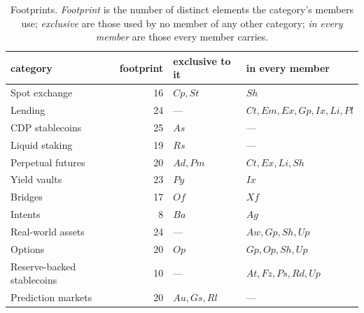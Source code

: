 \documentclass[11pt,reqno]{amsart}
\theoremstyle{plain}
\theoremstyle{definition}
\theoremstyle{remark}
\begin{document}
\begin{table}[t]\centering\small
\begin{tabular}{lrll}
\toprule
category & footprint & exclusive to it & in every member \\
\midrule
Spot exchange & 16 & $Cp,St$ & $Sh$ \\
Lending & 24 & --- & $Ct,Em,Ex,Gp,Ix,Li,Pl$ \\
CDP stablecoins & 25 & $As$ & --- \\
Liquid staking & 19 & $Rs$ & --- \\
Perpetual futures & 20 & $Ad,Pm$ & $Ct,Ex,Li,Sh$ \\
Yield vaults & 23 & $Py$ & $Ix$ \\
Bridges & 17 & $Of$ & $Xf$ \\
Intents & 8 & $Ba$ & $Ag$ \\
Real-world assets & 24 & --- & $Aw,Gp,Sh,Up$ \\
Options & 20 & $Op$ & $Gp,Op,Sh,Up$ \\
Reserve-backed stablecoins & 10 & --- & $At,Fz,Ps,Rd,Up$ \\
Prediction markets & 20 & $Au,Gs,Rl$ & --- \\
\bottomrule
\end{tabular}
\caption{Footprints. \emph{Footprint} is the number of distinct elements the
category's members use; \emph{exclusive} are those used by no member of any
other category; \emph{in every member} are those every member carries.}
\label{tab:footprints}
\end{table}
\end{document}
